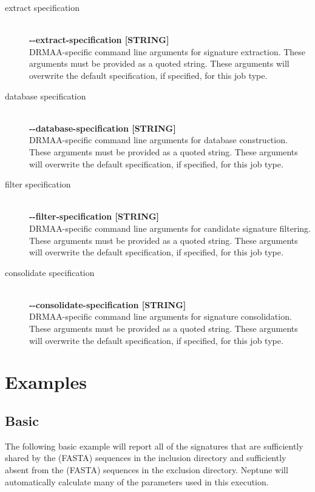 \documentclass[a4paper,10pt]{article}
\begin{document}
\begin{description}
  \item[extract specification] \hfill \\
  \textbf{-{}-extract-specification [STRING]} \hfill \\
  DRMAA-specific command line arguments for signature extraction. These arguments must be provided as a quoted string. These arguments will overwrite the default specification, if specified, for this job type.
  
  \item[database specification] \hfill \\
  \textbf{-{}-database-specification [STRING]} \hfill \\
  DRMAA-specific command line arguments for database construction. These arguments must be provided as a quoted string. These arguments will overwrite the default specification, if specified, for this job type.
  
  \item[filter specification] \hfill \\
  \textbf{-{}-filter-specification [STRING]} \hfill \\
  DRMAA-specific command line arguments for candidate signature filtering. These arguments must be provided as a quoted string. These arguments will overwrite the default specification, if specified, for this job type.
  
  \item[consolidate specification] \hfill \\
  \textbf{-{}-consolidate-specification [STRING]} \hfill \\
  DRMAA-specific command line arguments for signature consolidation. These arguments must be provided as a quoted string. These arguments will overwrite the default specification, if specified, for this job type.
  
\end{description}

\newpage
\section{Examples}

\subsection{Basic}

The following basic example will report all of the signatures that are sufficiently shared by the (FASTA) sequences in the inclusion directory and sufficiently absent from the (FASTA) sequences in the exclusion directory. Neptune will automatically calculate many of the parameters used in this execution.
\end{document}
